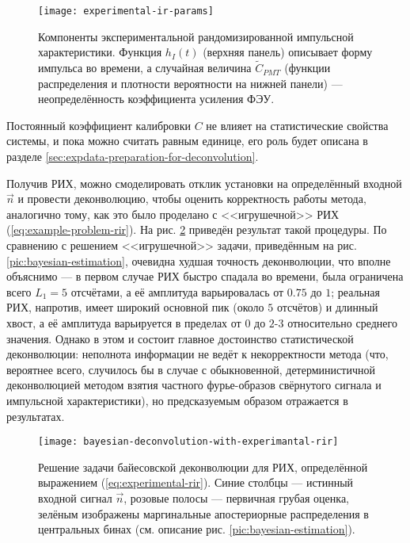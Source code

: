\begin{figure}
	\centering
	\texttt{[image: experimental-ir-params]}
	\caption{Компоненты экспериментальной рандомизированной импульсной характеристики. Функция $h_I(t)$ (верхняя панель) описывает форму импульса во времени, а случайная величина $\tilde{C}_{PMT}$ (функции распределения и плотности вероятности на нижней панели) --- неопределённость коэффициента усиления ФЭУ.}
	\label{pic:experimental-rir-params}
\end{figure}

Постоянный коэффициент калибровки $C$ не влияет на статистические свойства системы, и пока можно считать равным единице, его роль будет описана в разделе \ref{sec:expdata-preparation-for-deconvolution}.

Получив РИХ, можно смоделировать отклик установки на определённый входной $\vec{n}$ и провести деконволюцию, чтобы оценить корректность работы метода, аналогично тому, как это было проделано с <<игрушечной>> РИХ (\ref{eq:example-problem-rir}). На рис. \ref{pic:bayesian-deconvolution-with-experimantal-rir} приведён результат такой процедуры. По сравнению с решением <<игрушечной>> задачи, приведённым на рис. \ref{pic:bayesian-estimation}, очевидна худшая точность деконволюции, что вполне объяснимо --- в первом случае РИХ быстро спадала во времени, была ограничена всего $L_1=5$ отсчётами, а её амплитуда варьировалась от $0.75$ до $1$; реальная РИХ, напротив, имеет широкий основной пик (около $5$ отсчётов) и длинный хвост, а её амплитуда варьируется в пределах от $0$ до $2$-$3$  относительно среднего значения. Однако в этом и состоит главное достоинство статистической деконволюции: неполнота информации не ведёт к некорректности метода (что, вероятнее всего, случилось бы в случае с обыкновенной, детерминистичной деконволюцией методом взятия частного фурье-образов свёрнутого сигнала и импульсной характеристики), но предсказуемым образом отражается в результатах.

\begin{figure}
	\centering
	\texttt{[image: bayesian-deconvolution-with-experimantal-rir]}
	\caption{Решение задачи байесовской деконволюции для РИХ, определённой выражением (\ref{eq:experimental-rir}). Синие столбцы --- истинный входной сигнал $\vec{n}$, розовые полосы --- первичная грубая оценка, зелёным изображены маргинальные апостериорные распределения в центральных бинах (см. описание рис. \ref{pic:bayesian-estimation}).}
	\label{pic:bayesian-deconvolution-with-experimantal-rir}
\end{figure}

